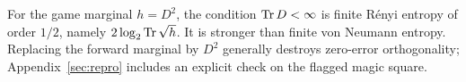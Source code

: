 \begin{remark}
For the game marginal $h=D^2$, the condition $\operatorname{Tr} D<\infty$ is finite R\'enyi entropy of order $1/2$, namely $2\log_2\operatorname{Tr}\sqrt h$. It is stronger than finite von Neumann entropy. Replacing the forward marginal by $D^2$ generally destroys zero-error orthogonality; Appendix~\ref{sec:repro} includes an explicit check on the flagged magic square.
\end{remark}
